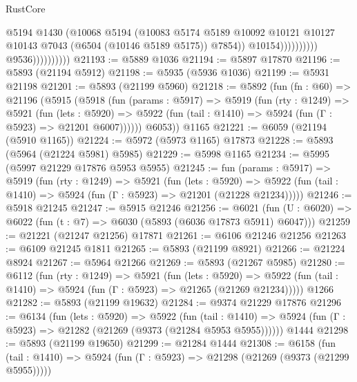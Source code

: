 \begin{lexlean}{RustCore}
\begin{coremodule}
                                            @5194
                                            @1430
                                            (@10068
                                              @5194
                                              (@10083
                                                @5174
                                                @5189
                                                @10092
                                                @10121
                                                @10127
                                                @10143
                                                @7043
                                                (@6504 (@10146 @5189 @5175))
                                                @7854))
                                            @10154))))))))))
                        @9536))))))))))
@21193 := @5889 @1036
@21194 := @5897 @17870
@21196 := @5893 (@21194 @5912)
@21198 := @5935 (@5936 @1036)
@21199 := @5931 @21198
@21201 := @5893 (@21199 @5960)
@21218 := @5892
    (fun (fn : @60) =>
    @21196
      (@5915
        (@5918
          (fun (params : @5917) =>
          @5919
            (fun (rty : @1249) =>
            @5921
              (fun (lets : @5920) =>
              @5922 (fun (tail : @1410) => @5924 (fun (Γ : @5923) => @21201 @6007))))))
        @6053))
    @1165
@21221 := @6059 (@21194 (@5910 @1165))
@21224 := @5972 (@5973 @1165) @17873
@21228 := @5893 (@5964 (@21224 @5981) @5985)
@21229 := @5998 @1165
@21234 := @5995 (@5997 @21229 @17876 @5953 @5955)
@21245 := fun (params : @5917) =>
  @5919
    (fun (rty : @1249) =>
    @5921
      (fun (lets : @5920) =>
      @5922 (fun (tail : @1410) => @5924 (fun (Γ : @5923) => @21201 (@21228 @21234)))))
@21246 := @5918 @21245
@21247 := @5915 @21246
@21256 := @6021
    (fun (U : @6020) => @6022 (fun (t : @7) => @6030 (@5893 (@6036 @17873 @5911) @6047)))
@21259 := @21221 (@21247 @21256) @17871
@21261 := @6106 @21246 @21256
@21263 := @6109 @21245 @1811
@21265 := @5893 (@21199 @8921)
@21266 := @21224 @8924
@21267 := @5964 @21266
@21269 := @5893 (@21267 @5985)
@21280 := @6112
    (fun (rty : @1249) =>
    @5921
      (fun (lets : @5920) =>
      @5922 (fun (tail : @1410) => @5924 (fun (Γ : @5923) => @21265 (@21269 @21234)))))
    @1266
@21282 := @5893 (@21199 @19632)
@21284 := @9374 @21229 @17876
@21296 := @6134
    (fun (lets : @5920) =>
    @5922
      (fun (tail : @1410) =>
      @5924 (fun (Γ : @5923) => @21282 (@21269 (@9373 (@21284 @5953 @5955))))))
    @1444
@21298 := @5893 (@21199 @19650)
@21299 := @21284 @1444
@21308 := @6158
    (fun (tail : @1410) => @5924 (fun (Γ : @5923) => @21298 (@21269 (@9373 (@21299 @5955)))))

\end{coremodule}
\end{lexlean}
